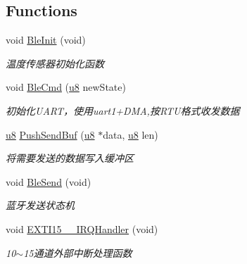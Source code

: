 \subsection*{\-Functions}
\begin{DoxyCompactItemize}
\item 
void \hyperlink{group___b_l_e_gad65e0136086cff966fcbd14a10a8a313}{\-Ble\-Init} (void)
\begin{DoxyCompactList}\small\item\em 温度传感器初始化函数 \end{DoxyCompactList}\item 
void \hyperlink{group___b_l_e_ga916dc062a2f77f89cce44866507bdf52}{\-Ble\-Cmd} (\hyperlink{group___b_s_p_gaed742c436da53c1080638ce6ef7d13de}{u8} new\-State)
\begin{DoxyCompactList}\small\item\em 初始化\-U\-A\-R\-T，使用uart1+\-D\-M\-A,按\-R\-T\-U格式收发数据 \end{DoxyCompactList}\item 
\hyperlink{group___b_s_p_gaed742c436da53c1080638ce6ef7d13de}{u8} \hyperlink{group___b_l_e_ga3fc122f9e39ecffe66a227b87d6051eb}{\-Push\-Send\-Buf} (\hyperlink{group___b_s_p_gaed742c436da53c1080638ce6ef7d13de}{u8} $\ast$data, \hyperlink{group___b_s_p_gaed742c436da53c1080638ce6ef7d13de}{u8} len)
\begin{DoxyCompactList}\small\item\em 将需要发送的数据写入缓冲区 \end{DoxyCompactList}\item 
void \hyperlink{group___b_l_e_ga0c4cf6eee7dc11b12abf30972e242b05}{\-Ble\-Send} (void)
\begin{DoxyCompactList}\small\item\em 蓝牙发送状态机 \end{DoxyCompactList}\item 
void \hyperlink{group___b_l_e_ga738473a5b43f6c92b80ce1d3d6f77ed9}{\-E\-X\-T\-I15\-\_\-\_\-\-I\-R\-Q\-Handler} (void)
\begin{DoxyCompactList}\small\item\em 10$\sim$15通道外部中断处理函数 \end{DoxyCompactList}\end{DoxyCompactItemize}
